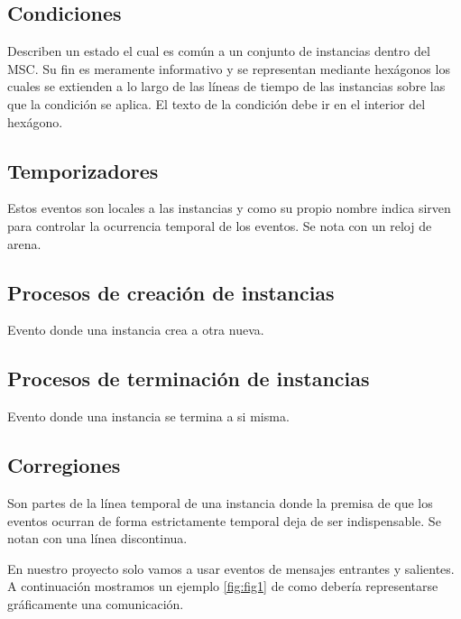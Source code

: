 \subsection*{Condiciones}
Describen un estado el cual es común a un conjunto de instancias
dentro del MSC. Su fin es meramente informativo y se representan
mediante hexágonos los cuales se extienden a lo largo de las líneas de
tiempo de las instancias sobre las que la condición se aplica. El
texto de la condición debe ir en el interior del hexágono.
\subsection*{Temporizadores}
Estos eventos son locales a las instancias y como su propio nombre
indica sirven para controlar la ocurrencia temporal de los eventos. Se
nota con un reloj de arena.
\subsection*{Procesos de creación de instancias} 
Evento donde una instancia crea a otra nueva.
\subsection*{Procesos de terminación de instancias}
Evento donde una instancia se termina a si misma.
\subsection*{Corregiones} 
Son partes de la línea temporal de una instancia donde la premisa de
que los eventos ocurran de forma estrictamente temporal deja de ser
indispensable. Se notan con una línea discontinua.

En nuestro proyecto solo vamos a usar eventos de mensajes entrantes y
salientes. A continuación mostramos un ejemplo \ref{fig:fig1} de como
debería representarse gráficamente una comunicación.

